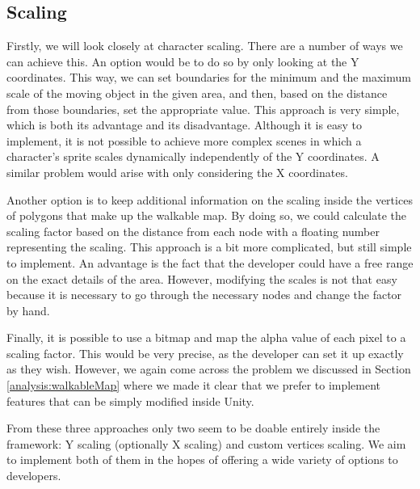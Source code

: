 \subsection{Scaling}
\label{analysis:depth:scaling}
Firstly, we will look closely at character scaling. There are a number of ways we can achieve this. An option would be to do so by only looking at the Y coordinates. This way, we can set boundaries for the minimum and the maximum scale of the moving object in the given area, and then, based on the distance from those boundaries, set the appropriate value. This approach is very simple, which is both its advantage and its disadvantage. Although it is easy to implement, it is not possible to achieve more complex scenes in which a character's sprite scales dynamically independently of the Y coordinates. A similar problem would arise with only considering the X coordinates.

Another option is to keep additional information on the scaling inside the vertices of polygons that make up the walkable map. By doing so, we could calculate the scaling factor based on the distance from each node with a floating number representing the scaling. This approach is a bit more complicated, but still simple to implement. An advantage is the fact that the developer could have a free range on the exact details of the area. However, modifying the scales is not that easy because it is necessary to go through the necessary nodes and change the factor by hand.

Finally, it is possible to use a bitmap and map the alpha value of each pixel to a scaling factor. This would be very precise, as the developer can set it up exactly as they wish. However, we again come across the problem we discussed in Section \ref{analysis:walkableMap} where we made it clear that we prefer to implement features that can be simply modified inside Unity.

From these three approaches only two seem to be doable entirely inside the framework: Y scaling (optionally X scaling) and custom vertices scaling. We aim to implement both of them in the hopes of offering a wide variety of options to developers.

